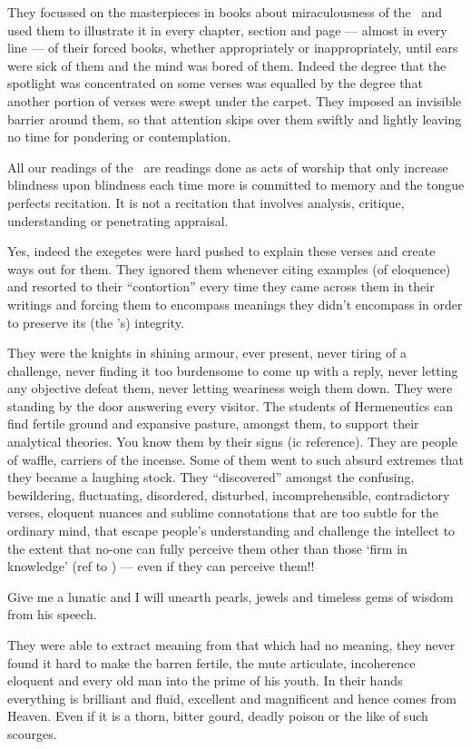 \documentclass[12pt]{memoir}
\begin{document}
They focussed on the masterpieces in books about miraculousness of the \Quran\
and used them to illustrate it in every chapter, section and page —
almost in every line — of their forced books,
whether appropriately or inappropriately,
until ears were sick of them and the mind was bored of them.
Indeed the degree that the spotlight was concentrated on some verses
was equalled by the degree that another portion of verses
were swept under the carpet.
They imposed an invisible barrier around them,
so that attention skips over them swiftly and lightly
leaving no time for pondering or contemplation.

All our readings of the \Quran\ are readings done as acts of worship
that only increase blindness upon blindness each time more
is committed to memory and the tongue perfects recitation.
It is not a recitation that involves analysis, critique,
understanding or penetrating appraisal.

Yes, indeed the exegetes were hard pushed to explain these verses
and create ways out for them.
They ignored them whenever citing examples (of eloquence)
and resorted to their “contortion” every time they came across them
in their writings and forcing them to encompass meanings
they didn’t encompass in order to preserve its (the \Quran’s) integrity.

They were the knights in shining armour, ever present,
never tiring of a challenge,
never finding it too burdensome to come up with a reply,
never letting any objective defeat them,
never letting weariness weigh them down.
They were standing by the door answering every visitor.
The students of Hermeneutics can find fertile ground and expansive pasture,
amongst them, to support their analytical theories.
You know them by their signs (\Quran{}ic reference).
They are people of waffle, carriers of the incense.
Some of them went to such absurd extremes that they became a laughing stock.
They “discovered” amongst the confusing, bewildering, fluctuating, disordered,
disturbed, incomprehensible, contradictory verses, eloquent nuances
and sublime connotations that are too subtle for the ordinary mind,
that escape people’s understanding and challenge the intellect to the extent
that no-one can fully perceive them other than those ‘firm in knowledge’
(ref to \Quran) — even if they can perceive them!!

Give me a lunatic and I will unearth pearls, jewels
and timeless gems of wisdom from his speech.

They were able to extract meaning from that which had no meaning,
they never found it hard to make the barren fertile,
the mute articulate, incoherence eloquent
and every old man into the prime of his youth.
In their hands everything is brilliant and fluid,
excellent and magnificent and hence comes from Heaven.
Even if it is a thorn, bitter gourd,
deadly poison or the like of such scourges.
\end{document}
